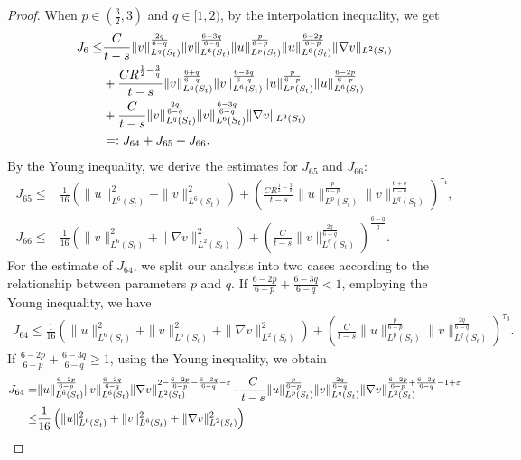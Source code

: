 \documentclass[11pt,reqno]{amsart}
\numberwithin{Thm}{section}
\begin{document}
\begin{proof}
	When  $p\in\left(\frac{3}{2},3\right)$ and $q\in[1,2)$, by the interpolation inequality,  we get
\begin{align}
	J_6 \leq& \frac{C}{t-s}\|v\|_{L^q(S_t)}^{\frac{2q}{6-q}} \|v\|_{L^6(S_t)}^{\frac{6-3q}{6-q}}
	\|u\|_{L^p(S_t)}^{\frac{p}{6-p}} \|u\|_{L^6(S_t)}^{\frac{6-2p}{6-p}} \|\nabla v\|_{L^2(S_t)}\notag\\
	&+\frac{CR^{\frac{1}{2}-\frac{3}{q}}}{t-s}\|v\|_{L^q(S_t)}^{\frac{6+q}{6-q}} \|v\|_{L^6(S_t)}^{\frac{6-3q}{6-q}}
	  \|u\|_{L^p(S_t)}^{\frac{p}{6-p}} \|u\|_{L^6(S_t)}^{\frac{6-2p}{6-p}}\notag\\
&+\frac{C}{t-s}\|v\|_{L^q(S_t)}^{\frac{2q}{6-q}} \|v\|_{L^6(S_t)}^{\frac{6-3q}{6-q}}\|\nabla v\|_{L^2(S_t)}\label{ine3.35a}\\
	&\mathrel{=:} J_{64} + J_{65} + J_{66}.\notag
\end{align}
By the Young inequality, we derive the estimates for $J_{65}$ and $J_{66}$:
\begin{align}
J_{65} \leq& \frac{1}{16}\left(\|u\|_{L^6(S_t)}^2 + \|v\|_{L^6(S_t)}^2\right)
+ \left( \frac{C R^{\frac{1}{2}-\frac{3}{q}}}{t-s} \|u\|_{L^p(S_t)}^{\frac{p}{6-p}} \|v\|_{L^q(S_t)}^{\frac{6+q}{6-q}} \right)^{\tau_4},\label{ine3.36a}\\
J_{66} \leq&\frac{1}{16}\left(\|v\|_{L^6(S_t)}^2 + \|\nabla v\|_{L^2(S_t)}^2\right)
+ \left( \frac{C}{t-s}  \|v\|_{L^q(S_t)}^{\frac{2q}{6-q}} \right)^{\frac{6-q}{q}}.\label{ine3.37a}
\end{align}
For the estimate of $J_{64}$, we split our analysis into two cases according to the relationship between parameters $p$ and $q$.
If $\frac{6-2p}{6-p} + \frac{6-3q}{6-q} < 1$, employing the Young inequality, we have
\begin{align}
J_{64} \leq \frac{1}{16}\left(\|u\|_{L^6(S_t)}^2 + \|v\|_{L^6(S_t)}^2 + \|\nabla v\|_{L^2(S_t)}^2\right)
+ \left(\frac{C}{t-s}\|u\|_{L^p(S_t)}^{\frac{p}{6-p}} \|v\|_{L^q(S_t)}^{\frac{2q}{6-q}}\right)^{\tau_3}.\label{ine3.38a}
\end{align}
If $\frac{6-2p}{6-p} + \frac{6-3q}{6-q} \geq 1$, using the Young inequality, we obtain
\begin{align}
	J_{64} =&\|u\|_{L^6(S_t)}^{\frac{6-2p}{6-p}} \|v\|_{L^6(S_t)}^{\frac{6-3q}{6-q}} \|\nabla v\|_{L^2(S_t)}^{2-\frac{6-2p}{6-p}-\frac{6-3q}{6-q}-\varepsilon} \cdot \frac{C}{t-s}\|u\|_{L^p(S_t)}^{\frac{p}{6-p}} \|v\|_{L^q(S_t)}^{\frac{2q}{6-q}} \|\nabla v\|_{L^2(S_t)}^{\frac{6-2p}{6-p}+\frac{6-3q}{6-q}-1+\varepsilon} \notag\\
	\leq&\frac{1}{16}\left(\|u\|_{L^6(S_t)}^2 + \|v\|_{L^6(S_t)}^2 + \|\nabla v\|_{L^2(S_t)}^2\right)\label{ine3.40a}\\

\end{align}
\end{proof}
\end{document}
